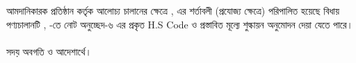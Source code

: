 \documentclass[12pt]{article}
\begin{document}
\begin{minipage}[t]{0.95\linewidth}
আমদানিকারক প্রতিষ্ঠান কর্তৃক আলোচ্য চালানের
ক্ষেত্রে
{\srooof}, {\srooofd}
এর শর্তাবলী (প্রযোজ্য ক্ষেত্রে) পরিপালিত হয়েছে
বিধায় পণ্যচালানটি {\srooof}, {\srooofd}
{\cpcfzn} -তে নোট অনুচ্ছেদ-৬ এর প্রকৃত H.S Code
ও প্রস্তাবিত মূল্যে শুল্কায়ন অনুমোদন দেয়া যেতে পারে।
\\
\\
সদয় অবগতি ও আদেশার্থে।
\end{minipage}
\thispagestyle{laststyle}
\end{document}
